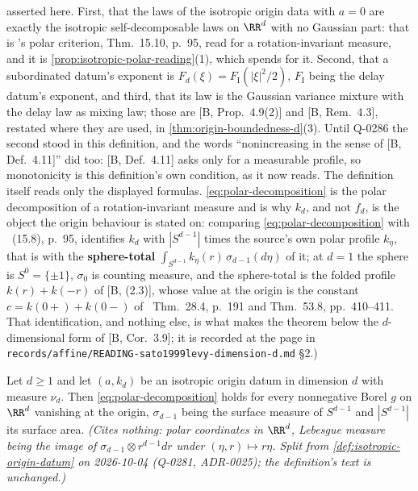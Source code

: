 \begin{definition}
{asserted here. First, that the laws of the isotropic origin data with $a = 0$ are exactly the
isotropic self-decomposable laws on $\RR^d$ with no Gaussian part: that is 's
polar criterion, Thm.~15.10, p.~95, read for a rotation-invariant \Levy{} measure, and it is
\ref{prop:isotropic-polar-reading}(1), which spends  for it. Second, that a
subordinated datum's exponent is $F_d(\xi) = F_{\mathrm I}(|\xi|^2/2)$, $F_{\mathrm I}$ being the
delay datum's exponent, and third, that its law is the Gaussian variance mixture with the delay law
as mixing law; those are [B, Prop.~4.9(2)] and [B, Rem.~4.3], restated where they are used, in
\ref{thm:origin-boundedness-d}(3). Until Q-0286 the second stood in this definition, and the
words ``nonincreasing in the sense of [B, Def.~4.11]'' did too: [B, Def.~4.11] asks only for a
measurable profile, so monotonicity is this definition's own condition, as it now reads. The
definition itself reads only the displayed formulas.
\ref{eq:polar-decomposition} is the polar decomposition of a rotation-invariant measure and is
why $k_d$, and not $f_d$, is the object the origin behaviour is stated on: comparing
\ref{eq:polar-decomposition} with ~(15.8), p.~95, identifies $k_d$ with
$|S^{d-1}|$ times the source's own polar profile $k_\eta$, that is with the
\textbf{sphere-total} $\int_{S^{d-1}}k_\eta(r)\,\sigma_{d-1}(d\eta)$ of it; at $d = 1$ the sphere is
$S^0 = \{\pm1\}$, $\sigma_0$ is counting measure, and the sphere-total is the folded profile
$k(r) + k(-r)$ of [B, (2.3)], whose value at the origin is the constant $c = k(0{+}) + k(0{-})$
of ~Thm.~28.4, p.~191 and Thm.~53.8, pp.~410--411. That identification, and
nothing else, is what makes the theorem below the $d$-dimensional form of
[B, Cor.~3.9]; it is recorded at the page in
\texttt{records/affine/READING-sato1999levy-dimension-d.md} \S 2.)}
\end{definition}

\begin{lemma}
\label{lem:polar-decomposition}
\leanok
Let $d \ge 1$ and let $(a, k_d)$ be an isotropic origin datum in dimension $d$ with \Levy{} measure
$\nu_d$. Then \ref{eq:polar-decomposition} holds for every nonnegative Borel $g$ on $\RR^d$
vanishing at the origin, $\sigma_{d-1}$ being the surface measure of $S^{d-1}$ and $|S^{d-1}|$ its
surface area.
\statusT\quad\emph{(Cites nothing: polar coordinates in $\RR^d$, Lebesgue measure being the image
of $\sigma_{d-1} \otimes r^{d-1}dr$ under $(\eta, r) \mapsto r\eta$. Split from
\ref{def:isotropic-origin-datum} on 2026-10-04 (Q-0281, ADR-0025); the definition's text is
unchanged.)}
\end{lemma}

